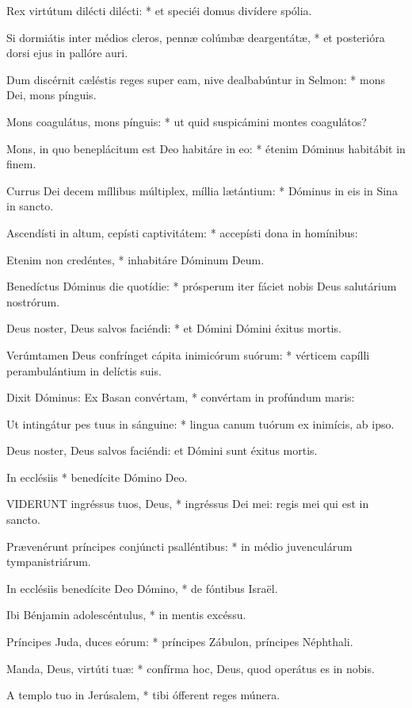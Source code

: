 Rex virtútum dilécti dilécti: * et speciéi domus divídere spólia.

Si dormiátis inter médios cleros, pennæ colúmbæ deargentátæ, * et posterióra dorsi ejus in pallóre auri.

Dum discérnit cæléstis reges super eam, nive dealbabúntur in Selmon: * mons Dei, mons pínguis.

Mons coagulátus, mons pínguis: * ut quid suspicámini montes coagulátos?

Mons, in quo beneplácitum est Deo habitáre in eo: * étenim Dóminus habitábit in finem.

Currus Dei decem míllibus múltiplex, míllia lætántium: * Dóminus in eis in Sina in sancto.

Ascendísti in altum, cepísti captivitátem: * accepísti dona in homínibus:

Etenim non credéntes, * inhabitáre Dóminum Deum.

Benedíctus Dóminus die quotídie: * prósperum iter fáciet nobis Deus salutárium nostrórum.

Deus noster, Deus salvos faciéndi: * et Dómini Dómini éxitus mortis.

Verúmtamen Deus confrínget cápita inimicórum suórum: * vérticem capílli perambulántium in delíctis suis.

Dixit Dóminus: Ex Basan convértam, * convértam in profúndum maris:

Ut intingátur pes tuus in sánguine: * lingua canum tuórum ex inimícis, ab ipso.

 Deus noster, Deus salvos faciéndi: et Dómini sunt éxitus mortis.

 In ecclésiis * benedícite Dómino Deo.


\lettrine[lines=2]{V}{IDERUNT} ingréssus tuos, Deus, * ingréssus Dei mei: regis mei qui est in sancto.

Prævenérunt príncipes conjúncti psalléntibus: * in médio juvenculárum tympanistriárum.

In ecclésiis benedícite Deo Dómino, * de fóntibus Israël.

Ibi Bénjamin adolescéntulus, * in mentis excéssu.

Príncipes Juda, duces eórum: * príncipes Zábulon, príncipes Néphthali.

Manda, Deus, virtúti tuæ: * confírma hoc, Deus, quod operátus es in nobis.

A templo tuo in Jerúsalem, * tibi ófferent reges múnera.

